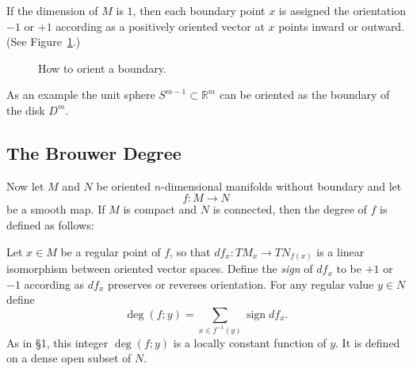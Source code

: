 If the dimension of $M$ is $1$, then each boundary point $x$ is assigned the orientation $-1$ or $+1$ according as a positively oriented vector at $x$ points inward or outward. (See Figure~\ref{fig:milnor-08}.)

\begin{figure}[htbp]
\centering
\setcounter{figure}{7}%
\caption{How to orient a boundary.}\label{fig:milnor-08}
\end{figure}

As an example the unit sphere $S^{m-1} \subset \mathbb{R}^m$ can be oriented as the boundary of the disk $D^m$.

\subsection{The Brouwer Degree}

Now let $M$ and $N$ be oriented $n$-dimensional manifolds without boundary and let
\[
f : M \to N
\]
be a smooth map. If $M$ is compact and $N$ is connected, then the degree of $f$ is defined as follows:

Let $x \in M$ be a regular point of $f$, so that $df_x : TM_x \to TN_{f(x)}$ is a linear isomorphism between oriented vector spaces. Define the \emph{sign} of $df_x$ to be $+1$ or $-1$ according as $df_x$ preserves or reverses orientation. For any regular value $y \in N$ define
\[
\deg(f; y) = \sum_{x \in f^{-1}(y)} \operatorname{sign} df_x.
\]
As in §1, this integer $\deg(f; y)$ is a locally constant function of $y$. It is defined on a dense open subset of $N$.

